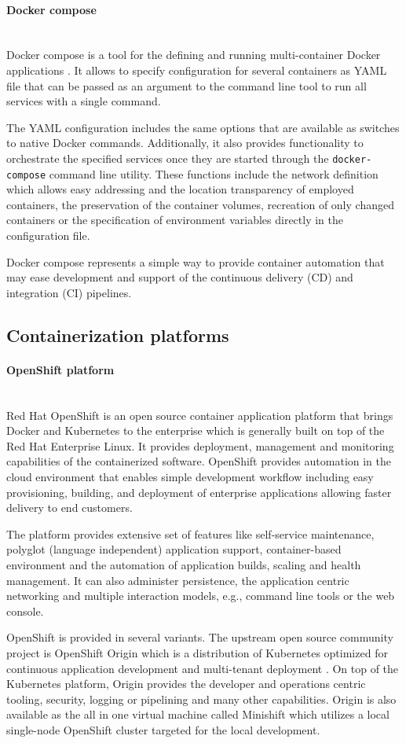 \documentclass[oneside,
  digital, %
  table,   %
  lof,     %
  lot,     %
]{fithesis3}
\newcommand{\newlinepar}[1]{\paragraph{#1}\needspace{3\baselineskip}\mbox{}\\}
\begin{document}
\newlinepar{Docker compose}

Docker compose is a tool for the defining and running multi-container Docker applications \cite{docker_compose}. It allows to specify configuration for several containers as YAML file that can be passed as an argument to the command line tool to run all services with a single command.

The YAML configuration includes the same options that are available as switches to native Docker commands. Additionally, it also provides functionality to orchestrate the specified services once they are started through the \texttt{docker-compose} command line utility. These functions include the network definition which allows easy addressing and the location transparency of employed containers, the preservation of the container volumes, recreation of only changed containers or the specification of environment variables directly in the configuration file. 

Docker compose represents a simple way to provide container automation that may ease development and support of the continuous delivery (CD) and integration (CI) pipelines.


\subsection{Containerization platforms}

\newlinepar{OpenShift platform}

Red Hat OpenShift is an open source container application platform that brings Docker and Kubernetes to the enterprise \cite{openshift} which is generally built on top of the Red Hat Enterprise Linux. It provides deployment, management and monitoring capabilities of the containerized software. OpenShift provides automation in the cloud environment that enables simple development workflow including easy provisioning, building, and deployment of enterprise applications allowing faster delivery to end customers.

The platform provides extensive set of features like self-service maintenance, polyglot (language independent) application support, container-based environment and the automation of application builds, scaling and health management. It can also administer persistence, the application centric networking and multiple interaction models, e.g., command line tools or the web console.

OpenShift is provided in several variants. The upstream open source community project is OpenShift Origin which is a distribution of Kubernetes optimized for continuous application development and multi-tenant deployment \cite{openshift}. On top of the Kubernetes platform, Origin provides the developer and operations centric tooling, security, logging or pipelining and many other capabilities. Origin is also available as the all in one virtual machine called Minishift which utilizes a local single-node OpenShift cluster targeted for the local development. 
\end{document}
